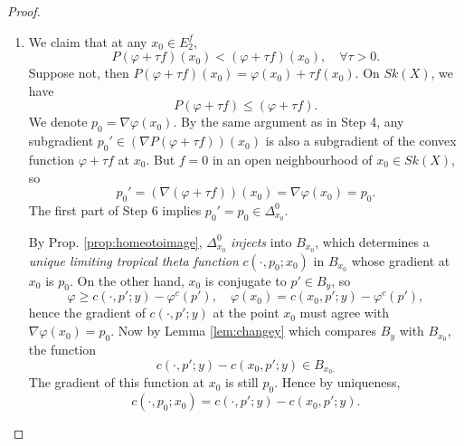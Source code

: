 \documentclass[a4paper]{article}
\theoremstyle{definition}
\begin{document}
\begin{proof}
\begin{enumerate}
		
		
		
		Given any model function $f$, we let $E_2^f$ to be  the subset consisting of the points $x\in E_2'$, such that
		\begin{itemize}
			\item  The function $f=0$ on some open neighbourhood of $x\in Sk(X)$,
			\item   There is some $x'\neq x\in Sk(X)$, and $p'\in B_y$, such that $x,x'$ are both conjugate to the same $p'\in B_y$, and $f(x')<0$.
		\end{itemize}
		We notice that at any $x\in E_2'$, we can always find such a model function $f$, so $E_2'= \bigcup_f E_2^f$.
		
		
		
		\item    We claim that at any $x_0\in E_2^f$,
		\[
		P(\varphi+\tau f) (x_0) < ( \varphi+\tau  f)(x_0)  ,\quad \forall \tau>0.
		\]
		Suppose not, then $P(\varphi+\tau f)(x_0)= \varphi(x_0) +\tau  f(x_0)$. On $ Sk(X)$, we have
		\[
		P(\varphi+\tau f) \leq  ( \varphi+\tau  f).
		\]
		We denote $p_0=\nabla \varphi(x_0)$. 
		By the same argument as in Step 4, any subgradient $p_0' \in ( \nabla P(\varphi+\tau f) )(x_0)$
		is also a subgradient of the convex function $\varphi+\tau f$ at $x_0$. 
		But $f=0$ in an open neighbourhood of $x_0\in Sk(X)$, so
	\begin{equation}
p_0'= (	\nabla ( \varphi+\tau f  ) )(x_0)= \nabla \varphi (x_0)=p_0.
	\end{equation}
	The first part of Step 6 implies $p_0'= p_0\in \Delta_{x_0}^0$. 
		
		
		
		
	By Prop. \ref{prop:homeotoimage}, $\Delta_{x_0}^0$ \emph{injects} into $B_{x_0}$, which determines a \emph{unique limiting tropical theta function} $c(\cdot, p_0; x_0)$ in $B_{x_0}$ whose gradient at $x_0$ is $p_0$. On the other hand, $x_0$ is conjugate to $p'\in B_y$, so 
	\[
	\varphi \geq c(\cdot, p'; y)- \varphi^c(p'), \quad 	\varphi(x_0)= c(x_0, p'; y)- \varphi^c(p'),
	\]
	hence the gradient of $c(\cdot, p'; y)$ at the point $x_0$ must agree with  $\nabla \varphi(x_0)=p_0$. Now by Lemma \ref{lem:changey} which compares $B_y$ with $B_{x_0}$, the function
	\[
	c(\cdot, p'; y)- c(x_0, p'; y) \in B_{x_0.}
	\]
The gradient of this function at $x_0$ is still $p_0$. Hence by uniqueness,
	\begin{equation}
	c(\cdot, p_0; x_0)= c(\cdot, p'; y)- c(x_0, p'; y).
	\end{equation}
		

\end{enumerate}
\end{proof}
\end{document}
